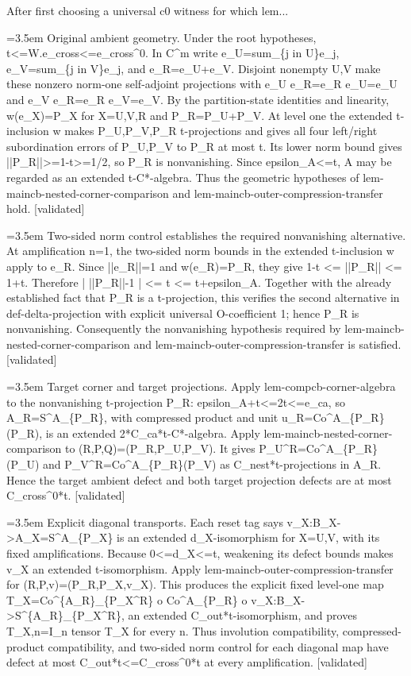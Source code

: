 \documentclass{article}
\newcommand{\step}[1]{\par\noindent\hangindent=3.5em\hangafter=1%
  \makebox[3.5em][l]{\textbf{#1.}}}
\newcommand{\steptag}[1]{\hfill{\small\textsf{[#1]}}}
\begin{document}
\begin{proofbox}{After first choosing a universal c0 witness for which lem...}
\step{1.2} Original ambient geometry. Under the root hypotheses, t<=W.e\_cross<=e\_cross\textasciicircum{}0. In C\textasciicircum{}m write e\_U=sum\_\{j in U\}e\_j, e\_V=sum\_\{j in V\}e\_j, and e\_R=e\_U+e\_V. Disjoint nonempty U,V make these nonzero norm-one self-adjoint projections with e\_U e\_R=e\_R e\_U=e\_U and e\_V e\_R=e\_R e\_V=e\_V. By the partition-state identities and linearity, w(e\_X)=P\_X for X=U,V,R and P\_R=P\_U+P\_V. At level one the extended t-inclusion w makes P\_U,P\_V,P\_R t-projections and gives all four left/right subordination errors of P\_U,P\_V to P\_R at most t. Its lower norm bound gives ||P\_R||>=1-t>=1/2, so P\_R is nonvanishing. Since epsilon\_A<=t, A may be regarded as an extended t-C*-algebra. Thus the geometric hypotheses of lem-maincb-nested-corner-comparison and lem-maincb-outer-compression-transfer hold. \steptag{validated} \\[6pt]
\step{1.2.1} Two-sided norm control establishes the required nonvanishing alternative. At amplification n=1, the two-sided norm bounds in the extended t-inclusion w apply to e\_R. Since ||e\_R||=1 and w(e\_R)=P\_R, they give 1-t <= ||P\_R|| <= 1+t. Therefore | ||P\_R||-1 | <= t <= t+epsilon\_A. Together with the already established fact that P\_R is a t-projection, this verifies the second alternative in def-delta-projection with explicit universal O-coefficient 1; hence P\_R is nonvanishing. Consequently the nonvanishing hypothesis required by lem-maincb-nested-corner-comparison and lem-maincb-outer-compression-transfer is satisfied. \steptag{validated} \\[4pt]
\step{1.3} Target corner and target projections. Apply lem-compcb-corner-algebra to the nonvanishing t-projection P\_R: epsilon\_A+t<=2t<=e\_ca, so A\_R=S\textasciicircum{}A\_\{P\_R\}, with compressed product and unit u\_R=Co\textasciicircum{}A\_\{P\_R\}(P\_R), is an extended 2*C\_ca*t-C*-algebra. Apply lem-maincb-nested-corner-comparison to (R,P,Q)=(P\_R,P\_U,P\_V). It gives P\_U\textasciicircum{}R=Co\textasciicircum{}A\_\{P\_R\}(P\_U) and P\_V\textasciicircum{}R=Co\textasciicircum{}A\_\{P\_R\}(P\_V) as C\_nest*t-projections in A\_R. Hence the target ambient defect and both target projection defects are at most C\_cross\textasciicircum{}0*t. \steptag{validated} \\[4pt]
\step{1.4} Explicit diagonal transports. Each reset tag says v\_X:B\_X->A\_X=S\textasciicircum{}A\_\{P\_X\} is an extended d\_X-isomorphism for X=U,V, with its fixed amplifications. Because 0<=d\_X<=t, weakening its defect bounds makes v\_X an extended t-isomorphism. Apply lem-maincb-outer-compression-transfer for (R,P,v)=(P\_R,P\_X,v\_X). This produces the explicit fixed level-one map T\_X=Co\textasciicircum{}\{A\_R\}\_\{P\_X\textasciicircum{}R\} o Co\textasciicircum{}A\_\{P\_R\} o v\_X:B\_X->S\textasciicircum{}\{A\_R\}\_\{P\_X\textasciicircum{}R\}, an extended C\_out*t-isomorphism, and proves T\_X,n=I\_n tensor T\_X for every n. Thus involution compatibility, compressed-product compatibility, and two-sided norm control for each diagonal map have defect at most C\_out*t<=C\_cross\textasciicircum{}0*t at every amplification. \steptag{validated} \\[4pt]

\end{proofbox}
\end{document}
